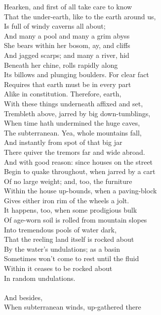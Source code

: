 Hearken, and first of all take care to know\\
That the under-earth, like to the earth around us,\\
Is full of windy caverns all about;\\
And many a pool and many a grim abyss\\
She bears within her bosom, ay, and cliffs\\
And jagged scarps; and many a river, hid\\
Beneath her chine, rolls rapidly along\\
Its billows and plunging boulders. For clear fact\\
Requires that earth must be in every part\\
Alike in constitution. Therefore, earth,\\
With these things underneath affixed and set,\\
Trembleth above, jarred by big down-tumblings,\\
When time hath undermined the huge caves,\\
The subterranean. Yea, whole mountains fall,\\
And instantly from spot of that big jar\\
There quiver the tremors far and wide abroad.\\
And with good reason: since houses on the street\\
Begin to quake throughout, when jarred by a cart\\
Of no large weight; and, too, the furniture\\
Within the house up-bounds, when a paving-block\\
Gives either iron rim of the wheels a jolt.\\
It happens, too, when some prodigious bulk\\
Of age-worn soil is rolled from mountain slopes\\
Into tremendous pools of water dark,\\
That the reeling land itself is rocked about\\
By the water's undulations; as a basin\\
Sometimes won't come to rest until the fluid\\
Within it ceases to be rocked about\\
In random undulations.\\
\\
And besides,\\
When subterranean winds, up-gathered there\\
